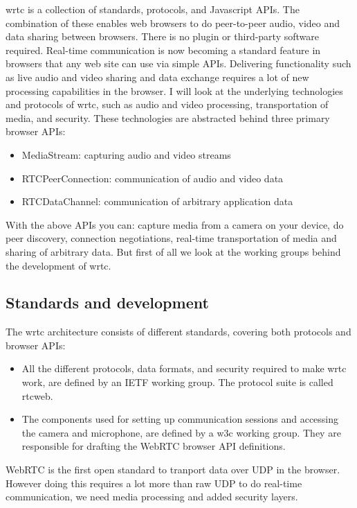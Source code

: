 
\gls{wrtc} is a collection of standards, protocols, and Javascript APIs. The combination of these enables web browsers to do peer-to-peer audio, video and data sharing between browsers. There is no plugin or third-party software required. Real-time communication is now becoming a standard feature in browsers that any web site can use via simple APIs. Delivering functionality such as live audio and video sharing and data exchange requires a lot of new processing capabilities in the browser. I will look at the underlying technologies and protocols of \gls{wrtc}, such as audio and video processing, transportation of media, and security. These technologies are abstracted behind three primary browser APIs:

\begin{itemize}
\item MediaStream: capturing audio and video streams
\item RTCPeerConnection: communication of audio and video data
\item RTCDataChannel: communication of arbitrary application data
\end{itemize}

With the above APIs you can: capture media from a camera on your device, do peer discovery, connection negotiations, real-time transportation of media and sharing of arbitrary data. But first of all we look at the working groups behind the development of \gls{wrtc}.

\subsection{Standards and development}
The \gls{wrtc} architecture consists of different standards, covering both protocols and browser APIs:

\begin{itemize}
\item All the different protocols, data formats, and security required to make \gls{wrtc} work, are defined by an IETF working group. The protocol suite is called \gls{rtcweb}.
\item The components used for setting up communication sessions and accessing the camera and microphone, are defined by a \gls{w3c} working group. They are responsible for drafting the WebRTC browser API definitions.
\end{itemize}

WebRTC is the first open standard to tranport data over UDP in the browser. However doing this requires a lot more than raw UDP to do real-time communication, we need media processing and added security layers.

